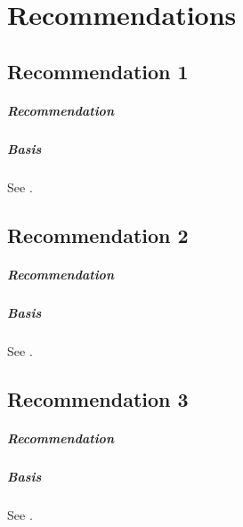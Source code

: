 \chapter{Recommendations}
\label{ch:recommendations}


\section{Recommendation 1}
\label{sec:rec:1}

\paragraph{Recommendation}
\lipsum[1][1]

\paragraph{Basis}
See .

\section{Recommendation 2}
\label{sec:rec:2}

\paragraph{Recommendation}
\lipsum[2][1]

\paragraph{Basis}
See .

\section{Recommendation 3}
\label{sec:rec:3}

\paragraph{Recommendation}
\lipsum[3][1]

\paragraph{Basis}
See .
